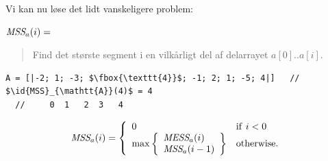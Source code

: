 \documentclass[rgb]{beamer}
\begin{document}
\begin{frame}[fragile]
\begin{footnotesize}

  \vspace{1ex}

  Vi kan nu løse det lidt vanskeligere problem:

  \vspace{1ex}

  $\mbox{\it{MSS}}_a(i) = $
  \begin{quote}
    Find det største segment i en vilkårligt del af delarrayet $a[0]..a[i]$.
  \end{quote}

  \vspace{1ex}

  \vspace{1ex}
\begin{lstlisting}[numbers=none,frame=none,mathescape]
  A = [|-2; 1; -3; $\fbox{\texttt{4}}$; -1; 2; 1; -5; 4|]   // $\id{MSS}_{\mathtt{A}}(4)$ = 4
  //     0  1   2  3   4
\end{lstlisting}
  \vspace{1ex}

  \vspace{1ex}

  \[
  \mbox{\it{MSS}}_a(i) = \left \{ \begin{array}{ll} 0 & \mathrm{if}~i < 0 \\
    \mathrm{max} \left \{ \begin{array}{l} \mbox{\it{MESS}}_a(i) \\
                                           \mbox{\it{MSS}}_a(i-1)
                          \end{array} \right \} & \mathrm{otherwise}. \end{array} \right .
  \]


\end{footnotesize}
\end{frame}
\end{document}
